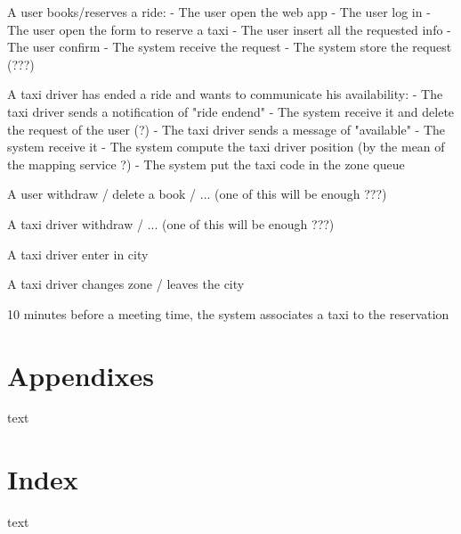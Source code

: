 \documentclass{book}
\begin{document}
A user books/reserves a ride:
- The user open the web app
- The user log in
- The user open the form to reserve a taxi
- The user insert all the requested info
- The user confirm
- The system receive the request
- The system store the request (???)

A taxi driver has ended a ride and wants to communicate his availability:
- The taxi driver sends a notification of "ride endend"
- The system receive it and delete the request of the user (?)
- The taxi driver sends a message of "available"
- The system receive it
- The system compute the taxi driver position (by the mean of the mapping service ?)
- The system put the taxi code in the zone queue

A user withdraw / delete a book / ... (one of this will be enough ???)

A taxi driver withdraw / ... (one of this will be enough ???)

A taxi driver enter in city

A taxi driver changes zone / leaves the city

10 minutes before a meeting time, the system associates a taxi to the reservation


\chapter*{Appendixes}
text

\chapter*{Index}
text
\end{document}
